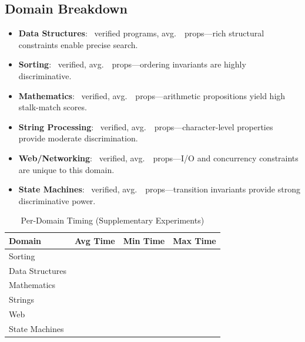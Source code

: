 \documentclass[11pt]{article}
\begin{document}
\subsection{Domain Breakdown}
\begin{itemize}[noitemsep]
  \item \textbf{Data Structures}: \expDomainDsVerified\ verified
        programs, avg.\ \expDomainDsAvgProps\ props---rich structural
        constraints enable precise search.
  \item \textbf{Sorting}: \expDomainSortVerified\ verified, avg.\
        \expDomainSortAvgProps\ props---ordering invariants are highly
        discriminative.
  \item \textbf{Mathematics}: \expDomainMathVerified\ verified, avg.\
        \expDomainMathAvgProps\ props---arithmetic propositions yield
        high stalk-match scores.
  \item \textbf{String Processing}: \expDomainStrVerified\ verified,
        avg.\ \expDomainStrAvgProps\ props---character-level properties
        provide moderate discrimination.
  \item \textbf{Web/Networking}: \expDomainWebVerified\ verified, avg.\
        \expDomainWebAvgProps\ props---I/O and concurrency constraints
        are unique to this domain.
  \item \textbf{State Machines}: \expDomainSmVerified\ verified, avg.\
        \expDomainSmAvgProps\ props---transition invariants provide
        strong discriminative power.
\end{itemize}

\begin{table}[H]
\centering
\caption{Per-Domain Timing (Supplementary Experiments)}
\label{tab:domain-timing}
\begin{tabular}{lccc}
\toprule
\textbf{Domain} & \textbf{Avg Time} & \textbf{Min Time} &
  \textbf{Max Time} \\
\midrule
Sorting         & \suppDomainSortAvgTime & \suppDomainSortMinTime &
  \suppDomainSortMaxTime \\
Data Structures & \suppDomainDsAvgTime   & \suppDomainDsMinTime &
  \suppDomainDsMaxTime \\
Mathematics     & \suppDomainMathAvgTime  & \suppDomainMathMinTime &
  \suppDomainMathMaxTime \\
Strings         & \suppDomainStrAvgTime   & \suppDomainStrMinTime &
  \suppDomainStrMaxTime \\
Web             & \suppDomainWebAvgTime   & \suppDomainWebMinTime &
  \suppDomainWebMaxTime \\
State Machines  & \suppDomainSmAvgTime    & \suppDomainSmMinTime &
  \suppDomainSmMaxTime \\
\bottomrule
\end{tabular}
\end{table}
\end{document}
